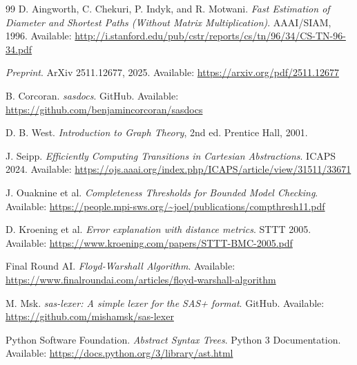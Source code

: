 \documentclass[12pt,a4paper]{report}
\begin{document}
\begin{thebibliography}{99}
D. Aingworth, C. Chekuri, P. Indyk, and R. Motwani. \emph{Fast Estimation of Diameter and Shortest Paths (Without Matrix Multiplication)}. AAAI/SIAM, 1996. Available: \url{http://i.stanford.edu/pub/cstr/reports/cs/tn/96/34/CS-TN-96-34.pdf}

\emph{Preprint}. ArXiv 2511.12677, 2025. Available: \url{https://arxiv.org/pdf/2511.12677}

B. Corcoran. \emph{sasdocs}. GitHub. Available: \url{https://github.com/benjamincorcoran/sasdocs}

D. B. West. \emph{Introduction to Graph Theory}, 2nd ed. Prentice Hall, 2001.

J. Seipp. \emph{Efficiently Computing Transitions in Cartesian Abstractions}. ICAPS 2024. Available: \url{https://ojs.aaai.org/index.php/ICAPS/article/view/31511/33671}

J. Ouaknine et al. \emph{Completeness Thresholds for Bounded Model Checking}. Available: \url{https://people.mpi-sws.org/~joel/publications/compthresh11.pdf}

D. Kroening et al. \emph{Error explanation with distance metrics}. STTT 2005. Available: \url{https://www.kroening.com/papers/STTT-BMC-2005.pdf}

Final Round AI. \emph{Floyd-Warshall Algorithm}. Available: \url{https://www.finalroundai.com/articles/floyd-warshall-algorithm}

M. Msk. \emph{sas-lexer: A simple lexer for the SAS+ format}. GitHub. Available: \url{https://github.com/mishamsk/sas-lexer}

Python Software Foundation. \emph{Abstract Syntax Trees}. Python 3 Documentation. Available: \url{https://docs.python.org/3/library/ast.html}

\end{thebibliography}
\end{document}
